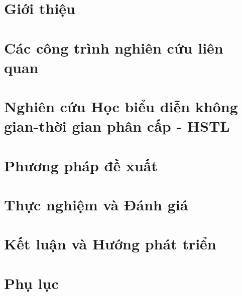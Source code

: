 \documentclass{beamer}
\begin{document}
\section{Giới thiệu}

\section{Các công trình nghiên cứu liên quan}

\section{Nghiên cứu Học biểu diễn không gian-thời gian phân cấp - HSTL}

\section{Phương pháp đề xuất}

\section{Thực nghiệm và Đánh giá}

\section{Kết luận và Hướng phát triển}

\appendix
{}

%     
%     
\section*{Phụ lục}

\end{document}
